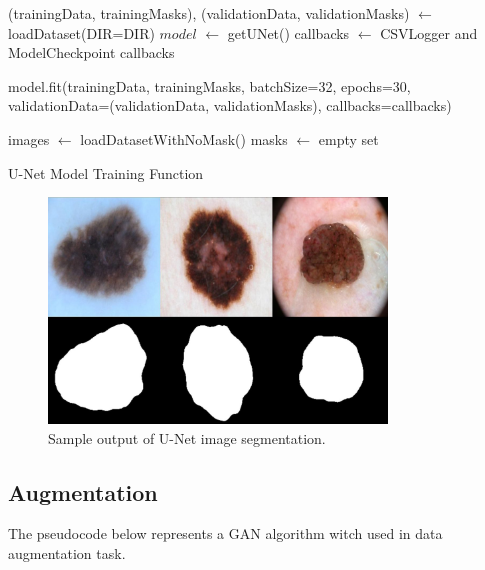 \documentclass[12pt]{diazessay}
\begin{document}
    
    \begin{algorithm}[H]
        \DontPrintSemicolon
        
        
            (trainingData, trainingMasks), (validationData, validationMasks) $\gets$ loadDataset(DIR=DIR) \;
        $model$ $\gets$ getUNet() \;
        callbacks $\gets$ CSVLogger and ModelCheckpoint callbacks \;
        
            model.fit(trainingData, trainingMasks, batchSize=32, epochs=30, validationData=(validationData, validationMasks), callbacks=callbacks)\;

        images $\gets$ loadDatasetWithNoMask() \;
        masks $\gets$ empty set \;

        \caption{U-Net Model Training Function}
        
        \label{alg:UnetTraining}
    \end{algorithm}

    \begin{figure}[htp]
        \centering
        \includegraphics[width=9cm]{Figures/UnetOutput.jpg}
        \caption[Sample Output of U-Net Image segmentation]{Sample output of U-Net image segmentation.}
        \label{fig:UnetOutput}
    \end{figure}

    \newpage
    \subsection{Augmentation}
    \hspace{0.7cm} The pseudocode below represents a GAN algorithm witch used in data augmentation task.\\
\end{document}
